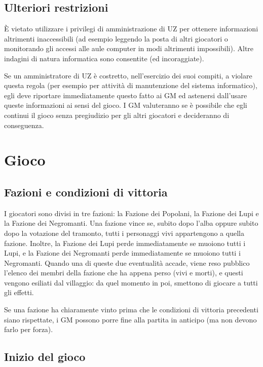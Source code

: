 \documentclass[a4paper,10pt]{article}
\begin{document}
\subsection{Ulteriori restrizioni}

È vietato utilizzare i privilegi di amministrazione di UZ per ottenere informazioni altrimenti inaccessibili (ad esempio leggendo la posta di altri giocatori o monitorando gli accessi alle aule computer in modi altrimenti impossibili). Altre indagini di natura informatica sono consentite (ed incoraggiate).

Se un amministratore di UZ è costretto, nell'esercizio dei suoi compiti, a violare questa regola (per esempio per attività di manutenzione del sistema informatico), egli deve riportare immediatamente questo fatto ai GM ed astenersi dall'usare queste informazioni ai sensi del gioco. I GM valuteranno se è possibile che egli continui il gioco senza pregiudizio per gli altri giocatori e decideranno di conseguenza.


\pagebreak
\section{Gioco}

\subsection{Fazioni e condizioni di vittoria}

I giocatori sono divisi in tre fazioni: la Fazione dei Popolani, la Fazione dei Lupi e la Fazione dei Negromanti. Una fazione vince se, subito dopo l'alba oppure subito dopo la votazione del tramonto, tutti i personaggi vivi appartengono a quella fazione. Inoltre, la Fazione dei Lupi perde immediatamente se muoiono tutti i Lupi, e la Fazione dei Negromanti perde immediatamente se muoiono tutti i Negromanti. Quando una di queste due eventualità accade, viene reso pubblico l'elenco dei membri della fazione che ha appena perso (vivi e morti), e questi vengono esiliati dal villaggio: da quel momento in poi, smettono di giocare a tutti gli effetti.

Se una fazione ha chiaramente vinto prima che le condizioni di vittoria precedenti siano rispettate, i GM possono porre fine alla partita in anticipo (ma non devono farlo per forza).

\subsection{Inizio del gioco}
\end{document}
